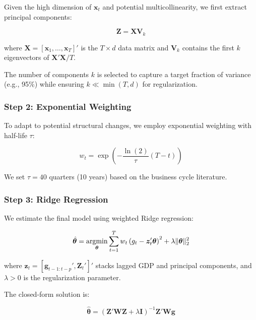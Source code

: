 \documentclass[11pt,letterpaper]{article}
\newcommand{\argmin}{\operatornamewithlimits{argmin}}
\theoremstyle{plain}
\theoremstyle{definition}
\theoremstyle{remark}
\begin{document}
Given the high dimension of $\bm{x}_t$ and potential multicollinearity, we first extract principal components:

\begin{equation}
\bm{Z} = \bm{X}\bm{V}_k
\label{eq:pca}
\end{equation}

where $\bm{X} = [\bm{x}_1, \ldots, \bm{x}_T]'$ is the $T \times d$ data matrix and $\bm{V}_k$ contains the first $k$ eigenvectors of $\bm{X}'\bm{X}/T$.

The number of components $k$ is selected to capture a target fraction of variance (e.g., 95\%) while ensuring $k \ll \min(T, d)$ for regularization.

\subsubsection{Step 2: Exponential Weighting}

To adapt to potential structural changes, we employ exponential weighting with half-life $\tau$:

\begin{equation}
w_t = \exp\left(-\frac{\ln(2)}{\tau}(T-t)\right)
\label{eq:weights}
\end{equation}

We set $\tau = 40$ quarters (10 years) based on the business cycle literature.

\subsubsection{Step 3: Ridge Regression}

We estimate the final model using weighted Ridge regression:

\begin{equation}
\hat{\bm{\theta}} = \argmin_{\bm{\theta}} \sum_{t=1}^T w_t \left(g_t - \bm{z}_t'\bm{\theta}\right)^2 + \lambda \|\bm{\theta}\|_2^2
\label{eq:ridge}
\end{equation}

where $\bm{z}_t = [\bm{g}_{t-1:t-p}', \bm{Z}_t']'$ stacks lagged GDP and principal components, and $\lambda > 0$ is the regularization parameter.

The closed-form solution is:

\begin{equation}
\hat{\bm{\theta}} = \left(\bm{Z}'\bm{W}\bm{Z} + \lambda\bm{I}\right)^{-1}\bm{Z}'\bm{W}\bm{g}
\label{eq:solution}
\end{equation}
\end{document}
